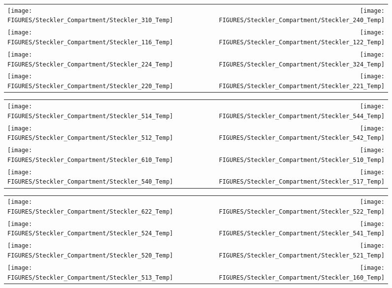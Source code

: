 \begin{figure}[p]
\begin{tabular*}{\textwidth}{l@{\extracolsep{\fill}}r}
\texttt{[image: FIGURES/Steckler\_Compartment/Steckler\_310\_Temp]} &
\texttt{[image: FIGURES/Steckler\_Compartment/Steckler\_240\_Temp]} \\
\texttt{[image: FIGURES/Steckler\_Compartment/Steckler\_116\_Temp]} &
\texttt{[image: FIGURES/Steckler\_Compartment/Steckler\_122\_Temp]} \\
\texttt{[image: FIGURES/Steckler\_Compartment/Steckler\_224\_Temp]} &
\texttt{[image: FIGURES/Steckler\_Compartment/Steckler\_324\_Temp]} \\
\texttt{[image: FIGURES/Steckler\_Compartment/Steckler\_220\_Temp]} &
\texttt{[image: FIGURES/Steckler\_Compartment/Steckler\_221\_Temp]}
\end{tabular*}
\label{Steckler_Temp_4}
\end{figure}

\begin{figure}[p]
\begin{tabular*}{\textwidth}{l@{\extracolsep{\fill}}r}
\texttt{[image: FIGURES/Steckler\_Compartment/Steckler\_514\_Temp]} &
\texttt{[image: FIGURES/Steckler\_Compartment/Steckler\_544\_Temp]} \\
\texttt{[image: FIGURES/Steckler\_Compartment/Steckler\_512\_Temp]} &
\texttt{[image: FIGURES/Steckler\_Compartment/Steckler\_542\_Temp]} \\
\texttt{[image: FIGURES/Steckler\_Compartment/Steckler\_610\_Temp]} &
\texttt{[image: FIGURES/Steckler\_Compartment/Steckler\_510\_Temp]} \\
\texttt{[image: FIGURES/Steckler\_Compartment/Steckler\_540\_Temp]} &
\texttt{[image: FIGURES/Steckler\_Compartment/Steckler\_517\_Temp]}
\end{tabular*}
\label{Steckler_Temp_5}
\end{figure}

\begin{figure}[p]
\begin{tabular*}{\textwidth}{l@{\extracolsep{\fill}}r}
\texttt{[image: FIGURES/Steckler\_Compartment/Steckler\_622\_Temp]} &
\texttt{[image: FIGURES/Steckler\_Compartment/Steckler\_522\_Temp]} \\
 \texttt{[image: FIGURES/Steckler\_Compartment/Steckler\_524\_Temp]} &
\texttt{[image: FIGURES/Steckler\_Compartment/Steckler\_541\_Temp]} \\
\texttt{[image: FIGURES/Steckler\_Compartment/Steckler\_520\_Temp]} &
\texttt{[image: FIGURES/Steckler\_Compartment/Steckler\_521\_Temp]} \\
\texttt{[image: FIGURES/Steckler\_Compartment/Steckler\_513\_Temp]} &
\texttt{[image: FIGURES/Steckler\_Compartment/Steckler\_160\_Temp]}
\end{tabular*}
\label{Steckler_Temp_6}
\end{figure}

